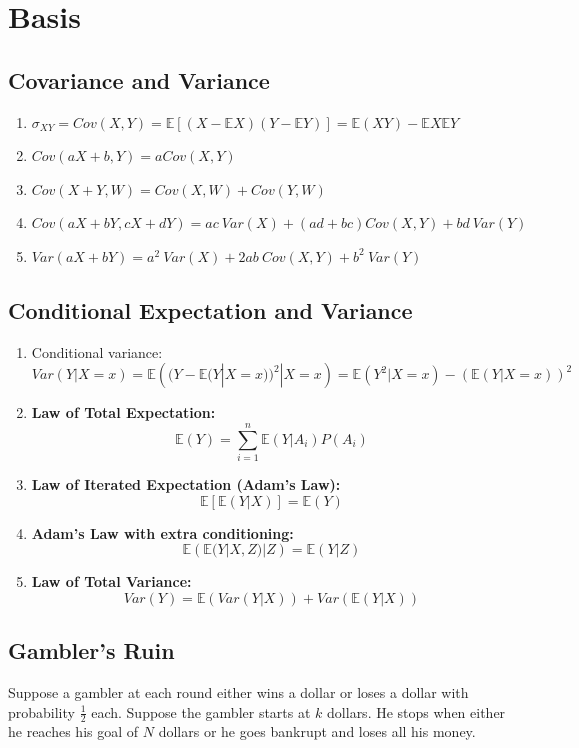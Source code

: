 \documentclass[11pt]{elegantbook}
\begin{document}
\chapter{Basis}
\section{Covariance and Variance}
\begin{enumerate}[(1)]
    \item $\sigma_{XY}=Cov(X,Y)=\mathbb{E}\left[(X-\mathbb{E}X)(Y-\mathbb{E}Y)\right]=\mathbb{E}(XY)-\mathbb{E}X\mathbb{E}Y$
    \item $Cov(aX+b,Y)=aCov(X,Y)$
    \item $Cov(X+Y,W)=Cov(X,W)+Cov(Y,W)$
    \item $Cov(aX+bY,cX+dY)=ac\ {Var}(X)+(ad+bc)Cov(X,Y)+bd\ {Var}(Y)$
    \item $Var(aX+bY)=a^2\ {Var}(X)+2ab\ Cov(X,Y)+b^2\ {Var}(Y)$
\end{enumerate}
\section{Conditional Expectation and Variance}
\begin{enumerate}[(1)]
    \item Conditional variance: $$Var(Y|X=x)=\mathbb{E}\left((Y-\mathbb{E}(Y|X=x))^2|X=x\right)
    =\mathbb{E}(Y^2|X=x)-(\mathbb{E}(Y|X=x))^2$$
    \item \textbf{Law of Total Expectation:} $$\mathbb{E}(Y)=\sum_{i=1}^n \mathbb{E}(Y|A_i)P(A_i)$$
    \item \textbf{Law of Iterated Expectation (Adam's Law):}
    $$\mathbb{E}\left[\mathbb{E}(Y|X)\right]=\mathbb{E}(Y)$$
    \item \textbf{Adam's Law with extra conditioning:} $$\mathbb{E}\left(\mathbb{E}(Y|X,Z)|Z\right)=\mathbb{E}(Y|Z)$$
    \item \textbf{Law of Total Variance:}$$Var(Y)=\mathbb{E}(Var(Y|X))+Var(\mathbb{E}(Y|X))$$
\end{enumerate}

\section{Gambler's Ruin}
Suppose a gambler at each round either wins a dollar or loses a dollar with probability $\frac{1}{2}$ each. Suppose the gambler starts at $k$ dollars. He stops when either he reaches his goal of $N$ dollars or he goes bankrupt and loses all his money.
\end{document}
